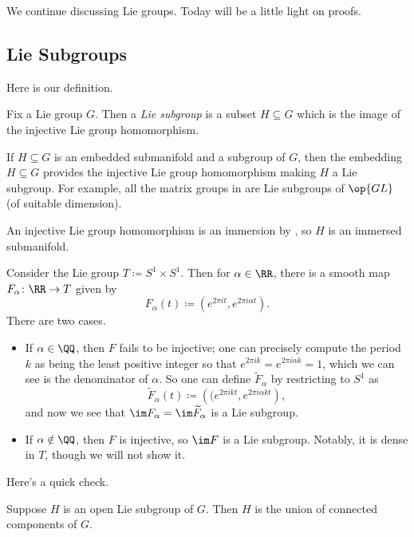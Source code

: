 \documentclass[../notes.tex]{subfiles}
\begin{document}
We continue discussing Lie groups. Today will be a little light on proofs.

\subsection{Lie Subgroups}
Here is our definition.
\begin{definition}
	Fix a Lie group $G$. Then a \textit{Lie subgroup} is a subset $H\subseteq G$ which is the image of the injective Lie group homomorphism.
\end{definition}
\begin{example}
	If $H\subseteq G$ is an embedded submanifold and a subgroup of $G$, then the embedding $H\subseteq G$ provides the injective Lie group homomorphism making $H$ a Lie subgroup. For example, all the matrix groups in  are Lie subgroups of $\op{GL}$ (of suitable dimension).
\end{example}
\begin{remark}
	An injective Lie group homomorphism is an immersion by , so $H$ is an immersed submanifold.
\end{remark}
\begin{example}
	Consider the Lie group $T\coloneqq S^1\times S^1$. Then for $\alpha\in\RR$, there is a smooth map $F_\alpha\colon\RR\to T$ given by
	\[F_\alpha(t)\coloneqq\left(e^{2\pi it},e^{2\pi i\alpha t}\right).\]
	There are two cases.
	\begin{itemize}
		\item If $\alpha\in\QQ$, then $F$ fails to be injective; one can precisely compute the period $k$ as being the least positive integer so that $e^{2\pi ik}=e^{2\pi i\alpha k}=1$, which we can see is the denominator of $\alpha$. So one can define $\widetilde F_\alpha$ by restricting to $S^1$ as
		\[\widetilde F_\alpha(t)\coloneqq\left((e^{2\pi ikt},e^{2\pi i\alpha kt}\right),\]
		and now we see that $\im F_\alpha=\im\widetilde F_\alpha$ is a Lie subgroup.
		\item If $\alpha\notin\QQ$, then $F$ is injective, so $\im F$ is a Lie subgroup. Notably, it is dense in $T$, though we will not show it.
	\end{itemize}
\end{example}
Here's a quick check.
\begin{lemma} \label{lem:open-lie-subgroup}
	Suppose $H$ is an open Lie subgroup of $G$. Then $H$ is the union of connected components of $G$.
\end{lemma}
\end{document}
